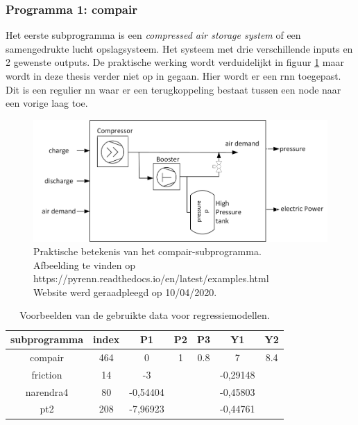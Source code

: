 		\subsubsection{Programma 1: compair}
		Het eerste subprogramma is een \textit{compressed air storage system} of een samengedrukte lucht opslagsysteem. Het systeem met drie verschillende inputs en 2 gewenste outputs. De praktische werking wordt verduidelijkt in figuur \ref{fig:compairPraktijk} maar wordt in deze thesis verder niet op in gegaan. Hier wordt er een \gls{rnn} toegepast. Dit is een regulier \gls{nn} waar er een terugkoppeling bestaat tussen een node naar een vorige laag toe. 
			
		\begin{figure}
			\centering
			\includegraphics[width=120mm]{afbeeldingen/compairPraktijk.PNG}
			\caption{Praktische betekenis van het compair-subprogramma. \\Afbeelding te vinden op https://pyrenn.readthedocs.io/en/latest/examples.html\\ Website werd geraadpleegd op 10/04/2020.}
			\label{fig:compairPraktijk}
		\end{figure}
	
		\begin{table}[]
			\centering
			\begin{tabular}{ccccccc}
				\hline
				subprogramma                   & index & P1       & P2 & P3  & Y1       & Y2  \\ \hline
				\multicolumn{1}{c|}{compair}   & 464   & 0        & 1  & 0.8 & 7        & 8.4 \\
				\multicolumn{1}{c|}{friction}  & 14    & -3       &    &     & -0,29148 &     \\
				\multicolumn{1}{c|}{narendra4} & 80    & -0,54404 &    &     & -0,45803 &     \\
				\multicolumn{1}{c|}{pt2}       & 208   & -7,96923 &    &     & -0,44761 &     \\ \hline
			\end{tabular}
			\caption{Voorbeelden van de gebruikte data voor regressiemodellen.}
			\label{tab:dataVoorbeelden}
		\end{table}
	
